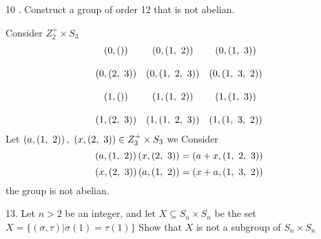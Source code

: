 \newpage
\begin{mdframed}[style=darkQuesion]
  10 . Construct a group of order 12 that is not abelian.
\end{mdframed}
\begin{mdframed}[style=darkAnswer,frametitle={Joe Starr}]
  Consider $Z_2^+\times S_3$ 
  $$  
  \begin{matrix}
      \left(0,\left(\right)\right)&
      \left(0,\left(1,\ 2\right)\right)&
      \left(0,\left(1,\ 3\right)\right)\\ \hspace{.5in} \\
      \left(0,\left(2,\ 3\right)\right)&
      \left(0,\left(1,\ 2,\ 3\right)\right)&
      \left(0,\left(1,\ 3,\ 2\right)\right)\\ \hspace{.5in} \\
      \left(1,\left(\right)\right)&
      \left(1,\left(1,\ 2\right)    \right)&
      \left(1,\left(1,\ 3\right)    \right)\\ \hspace{.5in} \\
      \left(1,\left(2,\ 3\right)    \right)&
      \left(1,\left(1,\ 2,\ 3\right)\right)&
      \left(1,\left(1,\ 3,\ 2\right)\right)
   \end{matrix}
    $$
   Let $\lrp{a,\lrp{1,\ 2}},\ \lrp{x,\lrp{2,\ 3}}\in Z_3^+\times S_3$ we Consider \\
   $$\lrp{a,\lrp{1,\ 2}}\lrp{x,\lrp{2,\ 3}}=\lrp{a+x,\lrp{1,\ 2,\ 3}}$$
   $$\lrp{x,\lrp{2,\ 3}}\lrp{a,\lrp{1,\ 2}}=\lrp{x+a,\lrp{1,\ 3,\ 2}}$$
     the group is not abelian. 
\end{mdframed}
\newpage
\begin{mdframed}[style=darkQuesion]
  13. Let $n>2$ be an integer, and let $X \subseteq S_{n} \times S_{n}$ be the set $X=\{(\sigma, \tau) | \sigma(1)=\tau(1)\}$ Show that $X$ is not a subgroup of $S_{n} \times S_{n}$
\end{mdframed}
